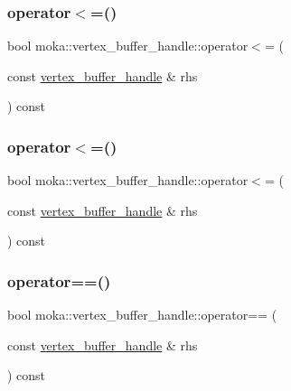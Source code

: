 \mbox{\label{structmoka_1_1vertex__buffer__handle_ad3f3043c57891760b8ec93678944e4c1}} 
\subsubsection{\texorpdfstring{operator$<$=()}{operator<=()}\hspace{0.1cm}{\footnotesize\ttfamily [1/2]}}
{\footnotesize\ttfamily bool moka\+::vertex\+\_\+buffer\+\_\+handle\+::operator$<$= (\begin{DoxyParamCaption}\item[{const \mbox{\hyperlink{structmoka_1_1vertex__buffer__handle}{vertex\+\_\+buffer\+\_\+handle}} \&}]{rhs }\end{DoxyParamCaption}) const}

\mbox{\label{structmoka_1_1vertex__buffer__handle_ad3f3043c57891760b8ec93678944e4c1}} 
\subsubsection{\texorpdfstring{operator$<$=()}{operator<=()}\hspace{0.1cm}{\footnotesize\ttfamily [2/2]}}
{\footnotesize\ttfamily bool moka\+::vertex\+\_\+buffer\+\_\+handle\+::operator$<$= (\begin{DoxyParamCaption}\item[{const \mbox{\hyperlink{structmoka_1_1vertex__buffer__handle}{vertex\+\_\+buffer\+\_\+handle}} \&}]{rhs }\end{DoxyParamCaption}) const}

\mbox{\label{structmoka_1_1vertex__buffer__handle_ad445e3612890e0c7a09ea8f3276f8ce3}} 
\subsubsection{\texorpdfstring{operator==()}{operator==()}\hspace{0.1cm}{\footnotesize\ttfamily [1/2]}}
{\footnotesize\ttfamily bool moka\+::vertex\+\_\+buffer\+\_\+handle\+::operator== (\begin{DoxyParamCaption}\item[{const \mbox{\hyperlink{structmoka_1_1vertex__buffer__handle}{vertex\+\_\+buffer\+\_\+handle}} \&}]{rhs }\end{DoxyParamCaption}) const}

